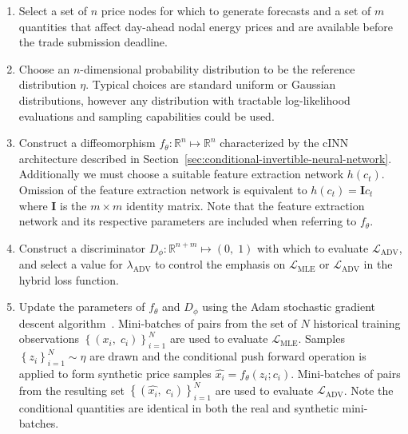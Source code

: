\begin{enumerate}
    \item Select a set of $n$ price nodes for which to generate forecasts and a set of $m$ quantities
    that affect day-ahead nodal energy prices and are available before the trade submission deadline.

    \item Choose an $n$-dimensional probability distribution to be the reference distribution $\eta$.
    Typical choices are standard uniform or Gaussian distributions, however any distribution with tractable
    log-likelihood evaluations and sampling capabilities could be used.

    \item Construct a diffeomorphism $f_\theta : \mathbb{R}^n \mapsto \mathbb{R}^n$ characterized by the cINN architecture
    described in Section~\ref{sec:conditional-invertible-neural-network}.
    Additionally we must choose a suitable feature extraction network $h(c_t)$.
    Omission of the feature extraction network is equivalent to $h(c_t) = \mathbf{I}c_t$ where $\mathbf{I}$
    is the $m \times m$ identity matrix.
    Note that the feature extraction network and its respective parameters are included when referring to $f_\theta$.

    \item Construct a discriminator $D_\phi : \mathbb{R}^{n + m} \mapsto (0,\;1)$ with which to evaluate $\mathcal{L}_{\text{ADV}}$,
    and select a value for $\lambda_{\text{ADV}}$ to control the emphasis on $\mathcal{L}_{\text{MLE}}$ or
    $\mathcal{L}_{\text{ADV}}$ in the hybrid loss function.

    \item Update the parameters of $f_\theta$ and $D_\phi$ using the Adam stochastic gradient descent algorithm~\cite{adam_optim}.
    Mini-batches of pairs from the set of $N$ historical training observations
    $\left\{ \left( x_i,\; c_i \right) \right\}_{i=1}^N$ are used to evaluate $\mathcal{L}_{\text{MLE}}$.
    Samples $\left\{ z_i \right\}_{i=1}^N \sim \eta$ are drawn and the conditional push forward operation is applied
    to form synthetic price samples $\hat{x_i} = f_\theta(z_i; c_i)$.
    Mini-batches of pairs from the resulting set $\left\{ \left(\hat{x_i},\; c_i \right) \right\}_{i=1}^N$ are used to
    evaluate $\mathcal{L}_{\text{ADV}}$.
    Note the conditional quantities are identical in both the real and synthetic mini-batches.
\end{enumerate}

